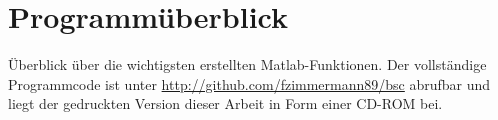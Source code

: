 \chapter{Programmüberblick}
Überblick über die wichtigsten erstellten Matlab-Funktionen. Der vollständige Programmcode ist unter {\url{http://github.com/fzimmermann89/bsc}} abrufbar und liegt der gedruckten Version dieser Arbeit in Form einer CD-ROM bei.
 
